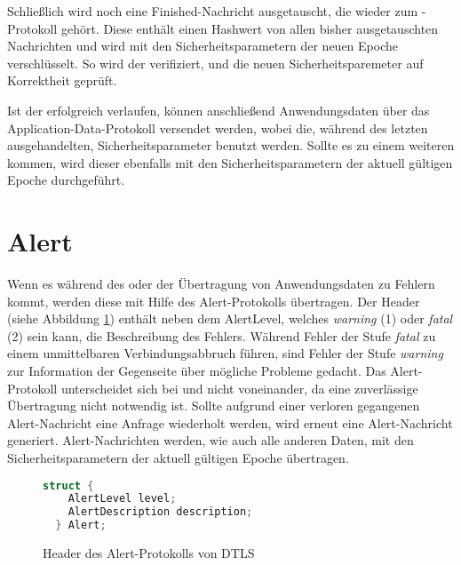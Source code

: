 Schließlich wird noch eine Finished-Nachricht ausgetauscht, die wieder zum -Protokoll gehört. Diese enthält einen Hashwert von allen bisher ausgetauschten
Nachrichten und wird mit den Sicherheitsparametern der neuen Epoche verschlüsselt. So wird der  verifiziert, und die neuen Sicherheitsparemeter auf Korrektheit
geprüft.

Ist der  erfolgreich verlaufen, können anschließend Anwendungsdaten über das Application-Data-Protokoll versendet werden,
wobei die, während des letzten  ausgehandelten, Sicherheitsparameter benutzt werden. Sollte es zu einem weiteren 
kommen, wird dieser ebenfalls mit den Sicherheitsparametern der aktuell gültigen Epoche durchgeführt.

\section{Alert}

Wenn es während des  oder der Übertragung von Anwendungsdaten zu Fehlern kommt, werden diese mit Hilfe des Alert-Protokolls übertragen.
Der Header (siehe Abbildung \ref{fig:alertlayer}) enthält neben dem AlertLevel, welches \textit{warning} (1) oder \textit{fatal} (2) sein kann,
die Beschreibung des Fehlers. Während Fehler der Stufe \textit{fatal} zu einem unmittelbaren Verbindungsabbruch führen, sind Fehler der Stufe
\textit{warning} zur Information der Gegenseite über mögliche Probleme gedacht. Das Alert-Protokoll unterscheidet sich bei  und 
nicht voneinander, da eine zuverlässige Übertragung nicht notwendig ist. Sollte aufgrund einer verloren gegangenen Alert-Nachricht eine Anfrage
wiederholt werden, wird erneut eine Alert-Nachricht generiert. Alert-Nachrichten werden, wie auch alle anderen Daten, mit den Sicherheitsparametern
der aktuell gültigen Epoche übertragen.

\begin{figure}[ht]
  \centering
  \begin{lstlisting}[language=c]
  struct {
    AlertLevel level;
    AlertDescription description;
  } Alert;
  \end{lstlisting}
  \caption{Header des Alert-Protokolls von DTLS}
  \label{fig:alertlayer}
\end{figure}
